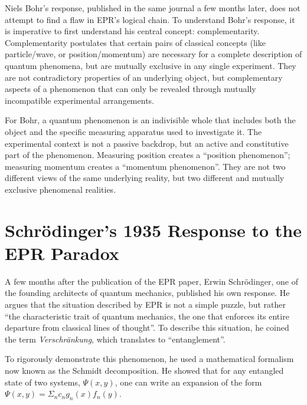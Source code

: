 Niels Bohr's response, published in the same journal a few months later, does not attempt to find a flaw in EPR's logical chain. To understand Bohr's response, it is imperative to first
understand his central concept: complementarity. Complementarity postulates that certain pairs of classical concepts (like particle/wave, or position/momentum) are necessary for a complete 
description of quantum phenomena, but are mutually exclusive in any single experiment. They are not contradictory properties of an underlying object, but complementary aspects of a phenomenon
that can only be revealed through mutually incompatible experimental arrangements.

For Bohr, a quantum phenomenon is an indivisible whole that includes both the object and the specific measuring apparatus used to investigate it. The experimental context is not a passive 
backdrop, but an active and constitutive part of the phenomenon. Measuring position creates a ``position phenomenon''; measuring momentum creates a ``momentum phenomenon''. They are not two 
different views of the same underlying reality, but two different and mutually exclusive phenomenal realities.

\section{Schrödinger's 1935 Response to the EPR Paradox}

A few months after the publication of the EPR paper, Erwin Schrödinger, one of the founding architects of quantum mechanics, published his own response. He argues that the situation described by
EPR is not a simple puzzle, but rather ``the characteristic trait of quantum mechanics, the one that enforces its entire departure from classical lines of thought''. To describe this situation,
he coined the term \textit{Verschränkung}, which translates to ``entanglement''.

To rigorously demonstrate this phenomenon, he used a mathematical formalism now known as the Schmidt decomposition. He showed that for any entangled state of two systems, $\Psi(x,y)$,
one can write an expansion of the form $\Psi(x,y)=\Sigma_n c_n g_n(x)f_n(y)$.
